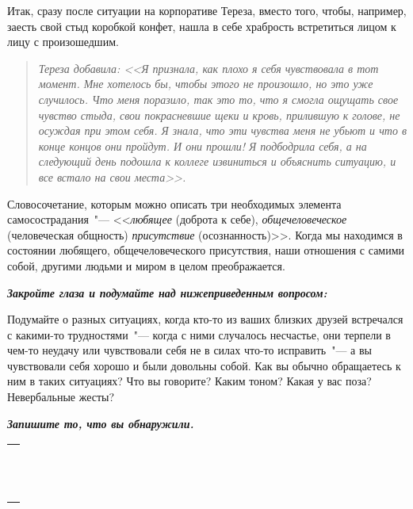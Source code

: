 Итак, сразу после ситуации на корпоративе Тереза, вместо того, чтобы, например, заесть свой стыд коробкой конфет, нашла в себе храбрость встретиться лицом к лицу с произошедшим.

\begin{quote} 
\textit{Тереза добавила: <<Я признала, как плохо я себя чувствовала в тот момент. Мне хотелось бы,  чтобы этого не произошло, но это уже случилось. Что меня поразило, так это то, что я смогла ощущать свое чувство стыда, свои покрасневшие щеки и кровь, прилившую к голове, не осуждая при этом себя. Я знала, что эти чувства меня не убьют и что в конце концов они пройдут. И они прошли! Я подбодрила себя, а на следующий день подошла к коллеге извиниться и объяснить ситуацию, и все встало на свои места>>.}
\end{quote}

Словосочетание, которым можно описать три необходимых элемента самосострадания~"--- <<\emph{любящее} (доброта к себе), \emph{общечеловеческое} (человеческая общность) \emph{присутствие} (осознанность)>>. Когда мы находимся в состоянии любящего, общечеловеческого присутствия, наши отношения с самими собой, другими людьми и миром в целом преображается.



\textbf{\textit{Закройте глаза и подумайте над нижеприведенным вопросом: }}

Подумайте о разных ситуациях, когда кто-то из ваших близких друзей встречался с какими-то трудностями~"--- когда с ними случалось несчастье, они терпели в чем-то неудачу или чувствовали себя не в силах что-то исправить~"--- а вы чувствовали себя хорошо и были довольны собой. Как вы обычно обращаетесь к ним в таких ситуациях? 
Что вы говорите? Каким тоном? Какая у вас поза? Невербальные жесты? 

\vspace{2ex}

\textbf{\textit{Запишите то, что вы обнаружили.}}

\setlength{\extrarowheight}{2mm}
\begin{tabularx}{\textwidth}{X}
	\\
	\arrayrulecolor{gray}\hline\\
	\hline\\
	\hline\\
	\hline\\
	\hline\\
	\hline\\
	\hline\\	
	\hline\\
	\hline\\
	\hline\\
	\hline\\
	\hline\\	
	\hline\\
\end{tabularx}
\setlength{\extrarowheight}{0mm}

